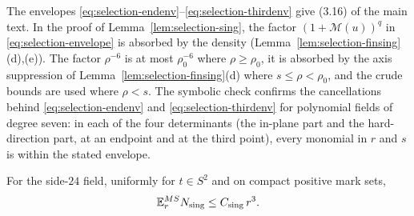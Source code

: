 The envelopes \eqref{eq:selection-endenv}--\eqref{eq:selection-thirdenv} give (3.16) of the main text. In the proof of Lemma~\ref{lem:selection-sing}, the factor $(1+\mathcal M(u))^q$ in \eqref{eq:selection-envelope} is absorbed by the density (Lemma~\ref{lem:selection-finsing}(d),(e)). The factor $\rho^{-6}$ is at most $\rho_0^{-6}$ where $\rho\ge\rho_0$, it is absorbed by the axis suppression of Lemma~\ref{lem:selection-finsing}(d) where $s\le\rho<\rho_0$, and the crude bounds are used where $\rho<s$. The symbolic check  confirms the cancellations behind \eqref{eq:selection-endenv} and \eqref{eq:selection-thirdenv} for polynomial fields of degree seven: in each of the four determinants (the in-plane part and the hard-direction part, at an endpoint and at the third point), every monomial in $r$ and $s$ is within the stated envelope.

\begin{lemma}\label{lem:selection-sing}
For the side-$24$ field, uniformly for $t\in S^2$ and on compact positive mark sets,
\begin{equation}\label{eq:selection-singcount}
\mathbb E^{MS}_rN_{\rm sing}\le C_{\rm sing}\,r^3 .
\end{equation}
\end{lemma}

